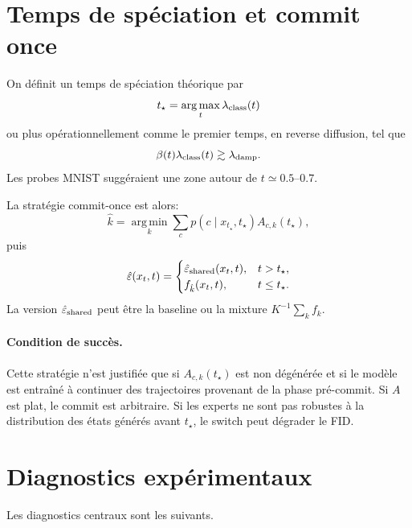 \documentclass[11pt,a4paper]{article}
\newcommand{\argmin}{\operatorname*{arg\,min}}
\newcommand{\argmax}{\operatorname*{arg\,max}}
\newcommand{\1}{\mathbf{1}}
\newcommand{\eps}{\varepsilon}
\newcommand{\xt}{x_t}
\begin{document}
\section{Temps de spéciation et commit once}

On définit un temps de spéciation théorique par
\begin{equation}
 t_\star=\argmax_t \lambda_{\rm class}(t)
\label{eq:tstar_argmax}
\end{equation}
ou plus opérationnellement comme le premier temps, en reverse diffusion, tel que
\begin{equation}
\beta(t)\lambda_{\rm class}(t)\gtrsim \lambda_{\rm damp}.
\label{eq:tstar_crossing}
\end{equation}
Les probes MNIST suggéraient une zone autour de $t\simeq 0.5$--$0.7$.

La stratégie commit-once est alors:
\begin{equation}
\hat k=\argmin_k\sum_c p(c\mid x_{t_\star},t_\star)A_{c,k}(t_\star),
\label{eq:commit_choice}
\end{equation}
puis
\begin{equation}
\hat\eps(\xt,t)=
\begin{cases}
\hat\eps_{\rm shared}(\xt,t), & t>t_\star,\\
f_{\hat k}(\xt,t), & t\le t_\star.
\end{cases}
\label{eq:commit_sampling}
\end{equation}
La version $\hat\eps_{\rm shared}$ peut être la baseline ou la mixture $K^{-1}\sum_k f_k$.

\paragraph{Condition de succès.}
Cette stratégie n'est justifiée que si $A_{c,k}(t_\star)$ est non dégénérée et si le modèle est entraîné à continuer des trajectoires provenant de la phase pré-commit. Si $A$ est plat, le commit est arbitraire. Si les experts ne sont pas robustes à la distribution des états générés avant $t_\star$, le switch peut dégrader le FID.

\section{Diagnostics expérimentaux}

Les diagnostics centraux sont les suivants.
\end{document}
